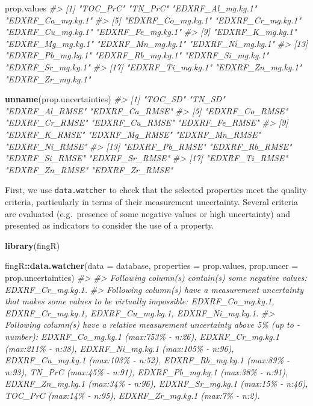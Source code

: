\documentclass[
]{article}
\newenvironment{Shaded}{\begin{snugshade}}{\end{snugshade}}
\newcommand{\AttributeTok}[1]{\textcolor[rgb]{0.13,0.29,0.53}{#1}}
\newcommand{\CommentTok}[1]{\textcolor[rgb]{0.56,0.35,0.01}{\textit{#1}}}
\newcommand{\FunctionTok}[1]{\textcolor[rgb]{0.13,0.29,0.53}{\textbf{#1}}}
\newcommand{\NormalTok}[1]{#1}
\newcommand{\SpecialCharTok}[1]{\textcolor[rgb]{0.81,0.36,0.00}{\textbf{#1}}}
\begin{document}
\begin{Shaded}
\begin{Highlighting}[]
\NormalTok{prop.values}
\CommentTok{\#\textgreater{}  [1] "TOC\_PrC"          "TN\_PrC"           "EDXRF\_Al\_mg.kg.1" "EDXRF\_Ca\_mg.kg.1"}
\CommentTok{\#\textgreater{}  [5] "EDXRF\_Co\_mg.kg.1" "EDXRF\_Cr\_mg.kg.1" "EDXRF\_Cu\_mg.kg.1" "EDXRF\_Fe\_mg.kg.1"}
\CommentTok{\#\textgreater{}  [9] "EDXRF\_K\_mg.kg.1"  "EDXRF\_Mg\_mg.kg.1" "EDXRF\_Mn\_mg.kg.1" "EDXRF\_Ni\_mg.kg.1"}
\CommentTok{\#\textgreater{} [13] "EDXRF\_Pb\_mg.kg.1" "EDXRF\_Rb\_mg.kg.1" "EDXRF\_Si\_mg.kg.1" "EDXRF\_Sr\_mg.kg.1"}
\CommentTok{\#\textgreater{} [17] "EDXRF\_Ti\_mg.kg.1" "EDXRF\_Zn\_mg.kg.1" "EDXRF\_Zr\_mg.kg.1"}

\FunctionTok{unname}\NormalTok{(prop.uncertainties)}
\CommentTok{\#\textgreater{}  [1] "TOC\_SD"        "TN\_SD"         "EDXRF\_Al\_RMSE" "EDXRF\_Ca\_RMSE"}
\CommentTok{\#\textgreater{}  [5] "EDXRF\_Co\_RMSE" "EDXRF\_Cr\_RMSE" "EDXRF\_Cu\_RMSE" "EDXRF\_Fe\_RMSE"}
\CommentTok{\#\textgreater{}  [9] "EDXRF\_K\_RMSE"  "EDXRF\_Mg\_RMSE" "EDXRF\_Mn\_RMSE" "EDXRF\_Ni\_RMSE"}
\CommentTok{\#\textgreater{} [13] "EDXRF\_Pb\_RMSE" "EDXRF\_Rb\_RMSE" "EDXRF\_Si\_RMSE" "EDXRF\_Sr\_RMSE"}
\CommentTok{\#\textgreater{} [17] "EDXRF\_Ti\_RMSE" "EDXRF\_Zn\_RMSE" "EDXRF\_Zr\_RMSE"}
\end{Highlighting}
\end{Shaded}

First, we use \texttt{data.watcher} to check that the selected
properties meet the quality criteria, particularly in terms of their
measurement uncertainty. Several criteria are evaluated (e.g.~presence
of some negative values or high uncertainty) and presented as indicators
to consider the use of a property.

\begin{Shaded}
\begin{Highlighting}[]
\FunctionTok{library}\NormalTok{(fingR)}

\NormalTok{fingR}\SpecialCharTok{::}\FunctionTok{data.watcher}\NormalTok{(}\AttributeTok{data =}\NormalTok{ database, }\AttributeTok{properties =}\NormalTok{ prop.values, }\AttributeTok{prop.uncer =}\NormalTok{ prop.uncertainties)}
\CommentTok{\#\textgreater{} }
\CommentTok{\#\textgreater{} Following column(s) contain(s) some negative values: EDXRF\_Cr\_mg.kg.1.}
\CommentTok{\#\textgreater{} Following column(s) have a measurement uncertainty that makes some values to be virtually impossible: EDXRF\_Co\_mg.kg.1, EDXRF\_Cr\_mg.kg.1, EDXRF\_Cu\_mg.kg.1, EDXRF\_Ni\_mg.kg.1.}
\CommentTok{\#\textgreater{} Following column(s) have a relative measurement uncertainty above 5\% (up to {-} number): EDXRF\_Co\_mg.kg.1 (max:753\% {-} n:26), EDXRF\_Cr\_mg.kg.1 (max:211\% {-} n:38), EDXRF\_Ni\_mg.kg.1 (max:105\% {-} n:96), EDXRF\_Cu\_mg.kg.1 (max:103\% {-} n:52), EDXRF\_Rb\_mg.kg.1 (max:89\% {-} n:93), TN\_PrC (max:45\% {-} n:91), EDXRF\_Pb\_mg.kg.1 (max:38\% {-} n:91), EDXRF\_Zn\_mg.kg.1 (max:34\% {-} n:96), EDXRF\_Sr\_mg.kg.1 (max:15\% {-} n:46), TOC\_PrC (max:14\% {-} n:95), EDXRF\_Zr\_mg.kg.1 (max:7\% {-} n:2).}
\end{Highlighting}
\end{Shaded}
\end{document}
